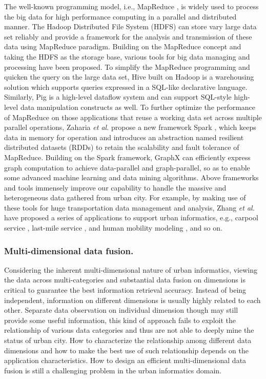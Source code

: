 The well-known programming model, i.e., MapReduce \cite{mapreduce}, is widely used to process the big data for high performance computing in a parallel and distributed manner. The Hadoop Distributed File System (HDFS) \cite{hadoop} can store vary large data set reliably and provide a framework for the analysis and transmission of these data using MapReduce paradigm. Building on the MapReduce concept and taking the HDFS as the storage base, various tools for big data managing and processing have been proposed. To simplify the MapReduce programming and quicken the query on the large data set, Hive \cite{hive} built on Hadoop is a warehousing solution which supports queries expressed in a SQL-like declarative language. Similarly, Pig \cite{pig} is a high-level dataflow system and can support SQL-style high-level data manipulation constructs as well. To further optimize the performance of MapReduce on those applications that reuse a working data set across multiple parallel operations, Zaharia \textit{et al.} propose a new framework Spark \cite{spark}, which keeps data in memory for operation and introduces an abstraction named resilient distributed datasets (RDDs) \cite{rdd} to retain the scalability and fault tolerance of MapReduce. Building on the Spark framework, GraphX \cite{graphx} can efficiently express graph computation to achieve data-parallel and graph-parallel, so as to enable some advanced machine learning and data mining algorithms. Above frameworks and tools immensely improve our capability to handle the massive and heterogeneous data gathered from urban city. For example, by making use of these tools for huge transportation data management and analysis, Zhang \textit{et al.} have proposed a series of applications to support urban informatics, e.g., carpool service \cite{coride}, last-mile service \cite{feeder}, and human mobility modeling \cite{multisource}, and so on.

\subsubsection{\textbf{Multi-dimensional data fusion.}} Considering the inherent multi-dimensional nature of urban informatics, viewing the data across multi-categories and substantial data fusion on dimensions is critical to guarantee the best information retrieval accuracy. Instead of being independent, information on different dimensions is usually highly related to each other. Separate data observation on individual dimension though may still provide some useful information, this kind of approach fails to exploit the relationship of various data categories and thus are not able to deeply mine the status of urban city. How to characterize the relationship among different data dimensions and how to make the best use of such relationship depends on the application characteristics. How to design an efficient multi-dimensional data fusion is still a challenging problem in the urban informatics domain.


